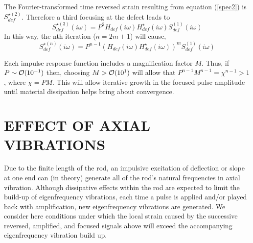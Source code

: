 \documentclass[11pt,letterpaper]{article}%
\begin{document}
The Fourier-transformed time reversed strain resulting from
equation (\ref{spec2}) is $S^{\star (2)}_{def}$.  Therefore a
third focusing at the defect leads to
\begin{equation}
S^{\star (3)}_{def}(i\omega) =
P^2H_{def}(i\omega)H^{\star}_{def}(i\omega)S^{(1)}_{def}(i\omega)
\label{spec3}
\end{equation}
In this way, the nth iteration ($n = 2m+1$) will cause,
\begin{equation}
S^{\star (n)}_{def}(i\omega) =
P^{n-1}\left(H_{def}(i\omega)H^{\star}_{def}(i\omega)\right)^mS^{(1)}_{def}(i\omega)
\label{specn}
\end{equation}

Each impulse response function includes a magnification factor
$M$. Thus, if $P \sim {\cal O}(10^{-1})$ then, choosing $M > {\cal
O}(10^{1})$ will allow that $P^{n-1} M^{n-1} = \chi^{n-1} > 1$,
where $\chi = PM$.  This will allow iterative growth in the
focused pulse amplitude until material dissipation helps bring
about convergence.

\section{EFFECT OF AXIAL VIBRATIONS}
\label{sect:vib}

Due to  the finite length of the rod, an impulsive excitation of
deflection or slope at one end can (in theory) generate all of the
rod's natural frequencies in axial vibration. Although dissipative
effects within the rod are expected to limit the build-up of
eigenfrequency vibrations, each time a pulse is applied and/or
played  back with amplification, new eigenfrequency vibrations are
generated.  We consider here conditions under which the local
strain caused by the successive reversed, amplified, and focused
signals above will exceed the accompanying eigenfrequency
vibration build up.
\end{document}
